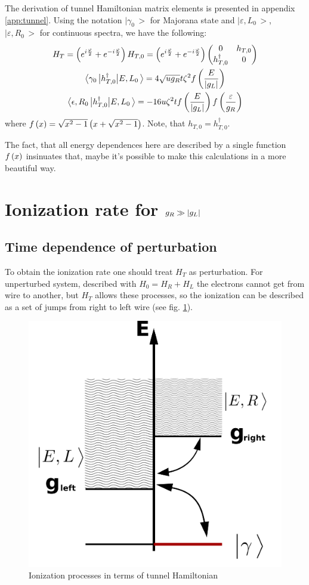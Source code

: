 The derivation of tunnel Hamiltonian matrix elements is presented in appendix \ref{app:tunnel}. Using the notation  $ \big|\gamma_{0}\,\big> $ for Majorana state and $ \big|\varepsilon,L_{0}\,\big> $, $ \big|\varepsilon,R_{0}\,\big> $ for continuous spectra, we have the following:
\begin{gather}
H_T=
\left(e^{i\frac{\varphi}{2}}+e^{-i\frac{\varphi}{2}}\right)
H_{T,0}
=
\left(e^{i\frac{\varphi}{2}}+e^{-i\frac{\varphi}{2}}\right)
\begin{pmatrix}
0 & h_{T,0} \\
h_{T,0}^\dagger & 0
\end{pmatrix}
\\
\label{tunnel_matrix_elements_maj-cont}
	\big<\gamma_{0}\,\big|h_{T,0}^{\dagger}\big|E,L_{0}\,\big>
	=
	4\sqrt{ug_{R}}
	t\zeta^{2}
	f\left(\frac{E}{\left|g_L\right|}\right)
	\\
	\label{tunnel_matrix_elements_cont-cont}
	\big<\epsilon,R_{0}\,\big|h_{T,0}^{\dagger}\big|E,L_{0}\,\big>
	=
	-16u\zeta^{2}t
	f\left(\frac{E}{\left|g_L\right|}\right)
	f\left(\frac{\varepsilon}{g_R}\right)
\end{gather}
where $ f\left(x\right)=\sqrt{x^2-1}\left(x+\sqrt{x^2-1}\right) $. Note, that $ h_{T,0} =h_{T,0}^\dagger $.

 The fact, that all energy dependences here are described by a single function $ f\left(x\right) $ insinuates that, maybe it's possible to make this calculations in a more beautiful way.

\section{Ionization rate for $ g_R\gg\left|g_L\right| $}


\subsection{Time dependence of perturbation}

To obtain the ionization rate one should treat $ H_T $ as perturbation. For unperturbed system, described with $ H_0=H_R+H_L $ the electrons cannot get from wire to another, but $ H_T $ allows these processes, so the ionization can be described as a set of jumps from right to left wire (see fig. \ref{fig:tunneling}).

\begin{figure}[H]
	\centering
	\includegraphics[width=0.6\linewidth]{images/tunneling}
	\caption{Ionization processes in terms of tunnel Hamiltonian}
	\label{fig:tunneling}
\end{figure}

